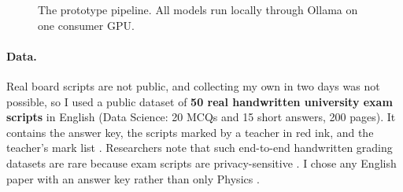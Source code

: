 \begin{figure}[H]
\centering
{}
\caption{The prototype pipeline. All models run locally through Ollama on one consumer GPU.}
\label{fig:pipeline}
\end{figure}

\paragraph{Data.} Real board scripts are not public, and collecting my own in two days was not possible, so I used a public
dataset of \textbf{50 real handwritten university exam scripts} in English (Data Science: 20 MCQs and 15 short answers, 200
pages). It contains the answer key, the scripts marked by a teacher in red ink, and the teacher's mark list
\citep{dataset2026}. Researchers note that such end-to-end handwritten grading datasets are rare because exam scripts are
privacy-sensitive \citep{engexams2026}. I chose any English paper with an answer key rather than only Physics .

